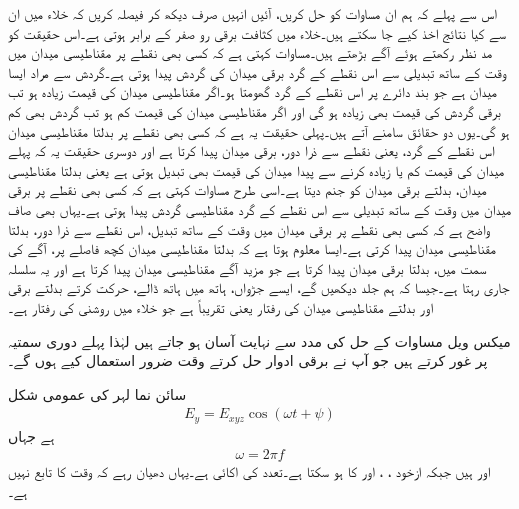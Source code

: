 اس سے پہلے کہ ہم ان مساوات کو حل کریں، آئیں انہیں صرف دیکھ کر فیصلہ کریں کہ خلاء میں ان سے  کیا نتائج اخذ کیے جا سکتے ہیں۔خلاء میں کثافت برقی رو   صفر کے برابر ہوتی ہے۔اس حقیقت کو مد نظر رکھتے ہوئے آگے بڑھتے ہیں۔مساوات  کہتی ہے کہ کسی بھی نقطے پر مقناطیسی میدان میں وقت کے ساتھ تبدیلی سے اس نقطے کے گرد برقی میدان کی گردش پیدا ہوتی ہے۔گردش سے مراد ایسا میدان ہے جو بند دائرے پر اس نقطے کے گرد گھومتا ہو۔اگر مقناطیسی میدان کی قیمت زیادہ ہو تب برقی گردش کی قیمت بھی زیادہ ہو گی اور اگر مقناطیسی میدان کی قیمت کم ہو تب گردش بھی کم ہو گی۔یوں دو حقائق سامنے آتے ہیں۔پہلی حقیقت یہ ہے کہ کسی بھی نقطے پر بدلتا مقناطیسی میدان اس نقطے کے گرد، یعنی نقطے سے ذرا دور، برقی میدان پیدا کرتا ہے اور دوسری حقیقت یہ کہ پہلے میدان کی قیمت کم یا زیادہ کرنے سے پیدا میدان کی قیمت بھی تبدیل ہوتی ہے یعنی بدلتا مقناطیسی میدان، بدلتے برقی میدان کو جنم دیتا ہے۔اسی طرح مساوات  کہتی ہے کہ کسی بھی نقطے پر برقی میدان میں وقت کے ساتھ تبدیلی سے اس نقطے کے گرد مقناطیسی گردش پیدا ہوتی ہے۔یہاں بھی صاف واضح ہے کہ کسی بھی نقطے پر برقی میدان میں وقت کے ساتھ تبدیل، اس نقطے سے ذرا دور، بدلتا مقناطیسی میدان پیدا کرتی ہے۔ایسا معلوم ہوتا ہے کہ بدلتا مقناطیسی میدان کچھ فاصلے پر، آگے کی سمت میں، بدلتا برقی میدان پیدا کرتا ہے جو مزید آگے مقناطیسی میدان پیدا کرتا ہے اور یہ سلسلہ جاری رہتا ہے۔جیسا کہ ہم جلد دیکھیں گے، ایسے جڑواں، ہاتھ میں ہاتھ ڈالے، حرکت کرتے بدلتے برقی اور بدلتے مقناطیسی میدان کی رفتار  یعنی تقریباً  ہے جو خلاء میں روشنی کی رفتار ہے۔

میکس ویل مساوات کے حل  کی مدد سے نہایت آسان ہو جاتے ہیں لہٰذا پہلے دوری سمتیہ پر غور کرتے ہیں جو آپ نے برقی ادوار حل کرتے وقت ضرور استعمال کیے ہوں گے۔

سائن نما لہر کی عمومی شکل 
\begin{align}\label{مساوات_موج_اصل_سائن_نما_تفاعل}
E_y =E_{xyz} \cos (\omega t +\psi)
\end{align} 
ہے جہاں
\begin{align}
\omega =2\pi f
\end{align}
 اور   ہیں جبکہ  ازخود ، ،  اور  کا  ہو سکتا ہے۔تعدد  کی اکائی  ہے۔یہاں دھیان رہے کہ  وقت  کا تابع نہیں ہے۔

